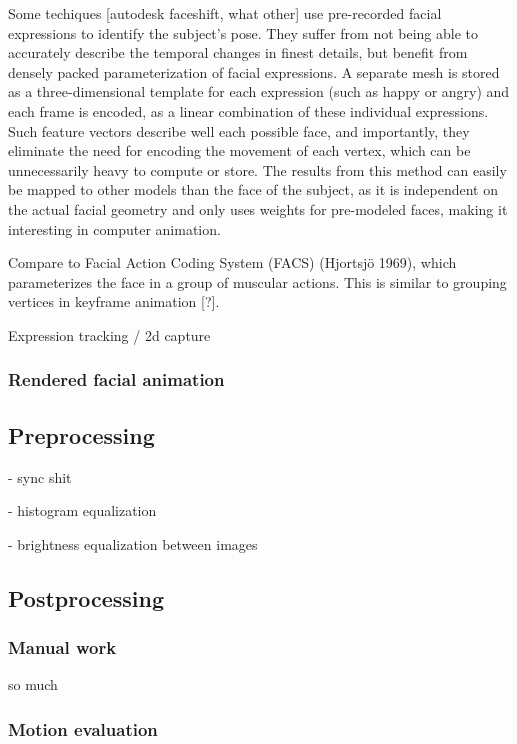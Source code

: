 Some techiques [autodesk faceshift, what other] use pre-recorded facial expressions to identify the subject's pose. They suffer from not being able to accurately describe the temporal changes in finest details, but benefit from densely packed parameterization of facial expressions.
A separate mesh is stored as a three-dimensional template for each expression (such as happy or angry) and each frame is encoded, as a linear combination of these individual expressions.
Such feature vectors describe well each possible face, and importantly, they eliminate the need for encoding the movement of each vertex, which can be unnecessarily heavy to compute or store.
The results from this method can easily be mapped to other models than the face of the subject, as it is independent on the actual facial geometry and only uses weights for pre-modeled faces, making it interesting in computer animation.

Compare to Facial Action Coding System (FACS) (Hjortsjö 1969), which parameterizes the face in a group of muscular actions. This is similar to grouping vertices in keyframe animation [?].

Expression tracking / 2d capture

\subsubsection{Rendered facial animation}


\subsection{Preprocessing}

- sync shit

- histogram equalization

- brightness equalization between images


\subsection{Postprocessing}

\subsubsection{Manual work}

so much

\subsubsection{Motion evaluation}
